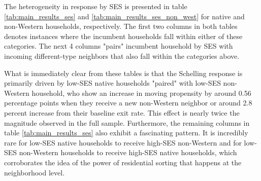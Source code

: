 \documentclass[../main.tex]{subfiles}
\begin{document}
The heterogeneity in response by SES is presented in table \ref{tab:main_results_ses} and \ref{tab:main_results_ses_non_west} for native and non-Western households, respectively. The first two columns in both tables denotes instances where the incumbent households fall within either of these categories. The next 4 columns "pairs" incumbent household by SES with incoming different-type neighbors that also fall within the categories above.

What is immediately clear from these tables is that the Schelling response is primarily driven by low-SES native households "paired" with low-SES non-Western household, who show an increase in moving propensity by around 0.56 percentage points when they receive a new non-Western neighbor or around 2.8 percent increase from their baseline exit rate. This effect is nearly twice the magnitude observed in the full sample. Furthermore, the remaining columns in table \ref{tab:main_results_ses} also exhibit a fascinating pattern. It is incredibly rare for low-SES native households to receive high-SES non-Western and for low-SES non-Western households to receive high-SES native households, which corroborates the idea of the power of residential sorting that happens at the neighborhood level. 
\end{document}
